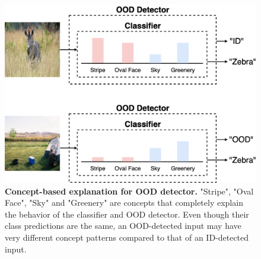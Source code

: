\begin{figure}[t]
\centering
\includegraphics[scale=0.17]{figures/separability.png} 
\caption{ \textbf{Concept-based explanation for OOD detector.} "Stripe", "Oval Face", "Sky" and "Greenery" are concepts that completely explain the behavior of the classifier and OOD detector.
Even though their class predictions are the same, an OOD-detected input may have very different concept patterns compared to that of an ID-detected input.}
\label{fig:detection-separability}
\end{figure}

\fi
%

